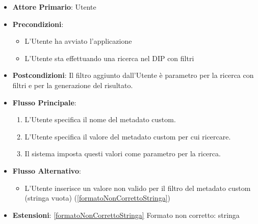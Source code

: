 \begin{itemize}
      \item \textbf{Attore Primario}: Utente
      \item \textbf{Precondizioni}: \begin{itemize}
            \item L'Utente ha avviato l'applicazione
            \item L'Utente sta effettuando una ricerca nel DIP con filtri
            \end{itemize}
      \item \textbf{Postcondizioni}: Il filtro aggiunto dall'Utente è parametro per la ricerca con filtri e per la generazione del risultato.
      \item \textbf{Flusso Principale}:
      \begin{enumerate}
            \item L'Utente specifica il nome del metadato custom.
            \item L'Utente specifica il valore del metadato custom per cui ricercare.
            \item Il sistema imposta questi valori come parametro per la ricerca.
      \end{enumerate}
      \item \textbf{Flusso Alternativo}:
      \begin{itemize}
            \item L'Utente inserisce un valore non valido per il filtro del metadato custom (stringa vuota) (\ref{formatoNonCorrettoStringa})
      \end{itemize}
      \item \textbf{Estensioni}: \ref{formatoNonCorrettoStringa} Formato non corretto: stringa
\end{itemize}

